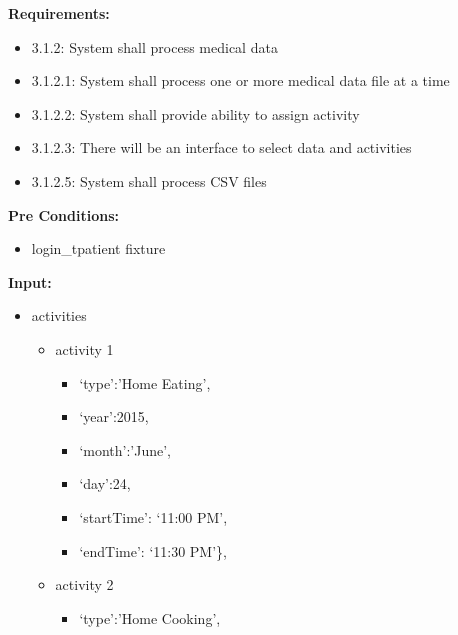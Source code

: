 \documentclass[letterpaper,10pt,english]{sphinxmanual}
\begin{document}
\begin{fulllineitems}
\label{STD/test_upload:test_upload.test_single_file_multi_activity}
\textbf{Requirements:}
\begin{itemize}
\item {} 
3.1.2: System shall process medical data

\item {} 
3.1.2.1: System shall process one or more medical data file at a time

\item {} 
3.1.2.2: System shall provide ability to assign activity

\item {} 
3.1.2.3: There will be an interface to select data and activities

\item {} 
3.1.2.5: System shall process CSV files

\end{itemize}

\textbf{Pre Conditions:}
\begin{itemize}
\item {} 
login\_tpatient fixture

\end{itemize}

\textbf{Input:}
\begin{itemize}
\item {} 
activities
\begin{itemize}
\item {} 
activity 1
\begin{itemize}
\item {} 
`type':'Home Eating',

\item {} 
`year':2015,

\item {} 
`month':'June',

\item {} 
`day':24,

\item {} 
`startTime': `11:00 PM',

\item {} 
`endTime': `11:30 PM'\},

\end{itemize}

\item {} 
activity 2
\begin{itemize}
\item {} 
`type':'Home Cooking',


\end{itemize}
\end{itemize}
\end{itemize}
\end{fulllineitems}
\end{document}
